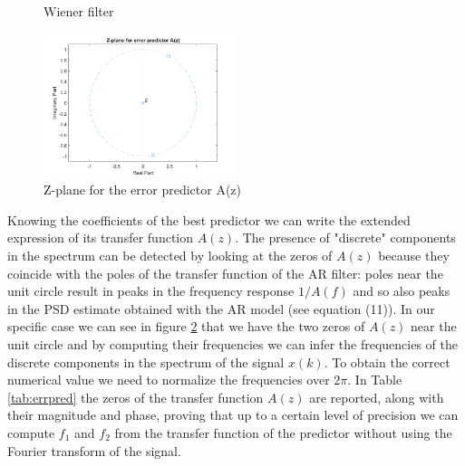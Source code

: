 \documentclass[a4paper, 12pt]{report}
\begin{document}
\begin{figure}[H]
	\caption{Wiener filter}
	\label{fig:wiener}
\end{figure}

\begin{figure}[H]
	\centering
	\includegraphics[width=0.5\textwidth]{zplane}
	\caption{Z-plane for the error predictor A(z)}
	\label{fig:zpln}
\end{figure}

Knowing the coefficients of the best predictor we can write the extended expression of its transfer function $A(z)$. The presence of "discrete" components in the spectrum can be detected by looking at the zeros of $A(z)$ because they coincide with the poles of the transfer function of the AR filter: poles near the unit circle result in peaks in the frequency response $1/A(f)$ and so also peaks in the PSD estimate obtained with the AR model (see equation (11)). In our specific case we can see in figure \ref{fig:zpln} that we have the two zeros of $A(z)$ near the unit circle and by computing their frequencies we can infer the frequencies of the discrete components in the spectrum of the signal $x(k)$. To obtain the correct numerical value we need to normalize the frequencies over $2\pi$.
In Table \ref{tab:errpred} the zeros of the transfer function $A(z)$ are reported, along with their magnitude and phase, proving that up to a certain level of precision we can compute $f_1$ and $f_2$ from the transfer function of the predictor without using the Fourier transform of the signal.
\end{document}
